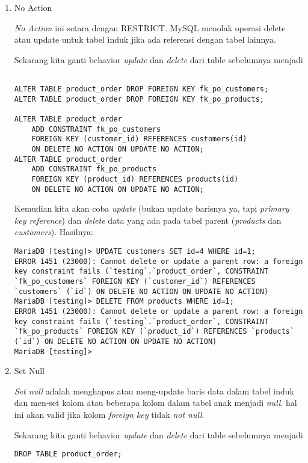 \documentclass[a4paper]{article}
\newcommand{\code}[1]{\allowbreak{\texttt{#1}}}
\begin{document}
\begin{enumerate}
	\item No Action

\textit{No Action} ini setara dengan RESTRICT. MySQL menolak operasi delete atau update untuk tabel induk jika ada referensi dengan tabel lainnya. 

Sekarang kita ganti behavior \textit{update} dan \textit{delete} dari table sebelumnya menjadi \code{No Action}
\begin{lstlisting}

ALTER TABLE product_order DROP FOREIGN KEY fk_po_customers;
ALTER TABLE product_order DROP FOREIGN KEY fk_po_products;

ALTER TABLE product_order
	ADD CONSTRAINT fk_po_customers 
	FOREIGN KEY (customer_id) REFERENCES customers(id)
	ON DELETE NO ACTION ON UPDATE NO ACTION;
ALTER TABLE product_order 
	ADD CONSTRAINT fk_po_products
	FOREIGN KEY (product_id) REFERENCES products(id)
	ON DELETE NO ACTION ON UPDATE NO ACTION;
\end{lstlisting}

Kemudian kita akan coba  \textit{update} (bukan update barisnya ya, tapi \textit{primary key reference}) dan \textit{delete} data yang ada pada tabel parent (\textit{products} dan \textit{customers}). Hasilnya:

\begin{lstlisting}
MariaDB [testing]> UPDATE customers SET id=4 WHERE id=1;
ERROR 1451 (23000): Cannot delete or update a parent row: a foreign key constraint fails (`testing`.`product_order`, CONSTRAINT `fk_po_customers` FOREIGN KEY (`customer_id`) REFERENCES `customers` (`id`) ON DELETE NO ACTION ON UPDATE NO ACTION)
MariaDB [testing]> DELETE FROM products WHERE id=1;
ERROR 1451 (23000): Cannot delete or update a parent row: a foreign key constraint fails (`testing`.`product_order`, CONSTRAINT `fk_po_products` FOREIGN KEY (`product_id`) REFERENCES `products` (`id`) ON DELETE NO ACTION ON UPDATE NO ACTION)
MariaDB [testing]> 
\end{lstlisting}


	\item Set Null

\textit{Set null} adalah menghapus atau meng-update baris data dalam tabel induk dan men-set kolom atau beberapa kolom dalam tabel anak menjadi \textit{null}. hal ini akan valid jika kolom \textit{foreign key} tidak \textit{not null}. 

Sekarang kita ganti behavior \textit{update} dan \textit{delete} dari table sebelumnya menjadi \code{SET NULL}
\begin{lstlisting}
DROP TABLE product_order;


\end{lstlisting}
\end{enumerate}
\end{document}
